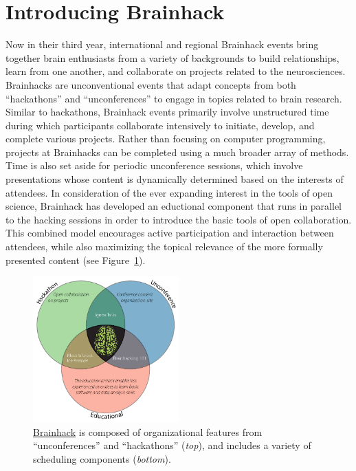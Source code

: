 \documentclass[11pt]{bmc_article_s50}
\begin{document}

\section{Introducing Brainhack}

Now in their third year, international and regional Brainhack events bring together brain enthusiasts from a variety of backgrounds to build relationships, learn from one another, and collaborate on projects related to the neurosciences. Brainhacks are unconventional events that adapt concepts from both ``hackathons'' and ``unconferences'' to engage in topics related to brain research. Similar to hackathons, Brainhack events primarily involve unstructured time during which participants collaborate intensively to initiate, develop, and complete various projects. Rather than focusing on computer programming, projects at Brainhacks can be completed using a much broader array of methods. Time is also set aside for periodic unconference sessions, which involve presentations whose content is dynamically determined based on the interests of attendees. In consideration of the ever expanding interest in the tools of open science, Brainhack has developed an eductional component that runs in parallel to the hacking sessions in order to introduce the basic tools of open collaboration. This combined model encourages active participation and interaction between attendees, while also maximizing the topical relevance of the more formally presented content (see Figure~\ref{fig1}).

\begin{figure}[htp]
\begin{center}
  \includegraphics[width=0.5\textwidth]{Figure_01}
  \caption{\href{http://www.brainhack.org}{Brainhack} is composed of organizational features from ``unconferences'' and ``hackathons'' (\emph{top}), and includes a variety of scheduling components (\emph{bottom}).}
  \label{fig1}
\end{center}
\end{figure}
\end{document}
